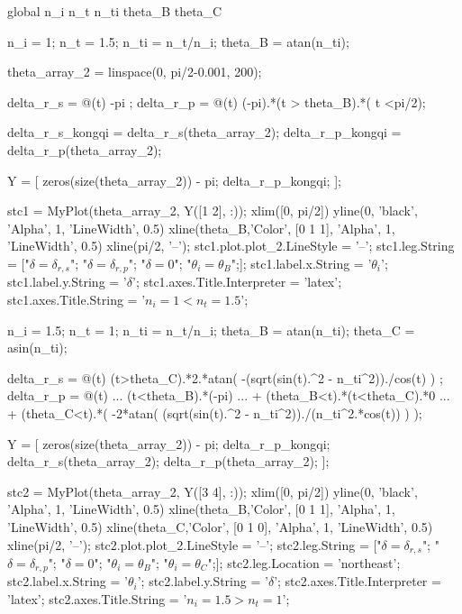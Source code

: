 \documentclass[UTF8]{report}
\theoremstyle{MyLineTheoremStyle} %
\theoremstyle{MyBlockTheoremStyle} %
\theoremstyle{MySubsubsectionStyle} %
\begin{document}
\begin{matlablisting}
global n_i n_t n_ti theta_B theta_C 

n_i = 1;
n_t = 1.5;
n_ti = n_t/n_i;
theta_B = atan(n_ti);

theta_array_2 = linspace(0, pi/2-0.001, 200);

delta_r_s = @(t) -pi ;
delta_r_p = @(t) (-pi).*(t > theta_B).*( t <pi/2);

delta_r_s_kongqi = delta_r_s(theta_array_2);
delta_r_p_kongqi = delta_r_p(theta_array_2);

Y = [
    zeros(size(theta_array_2)) - pi;
    delta_r_p_kongqi;    
];

stc1 = MyPlot(theta_array_2, Y([1 2], :));
xlim([0, pi/2])
yline(0, 'black', 'Alpha', 1, 'LineWidth', 0.5)
xline(theta_B,'Color', [0 1 1], 'Alpha', 1, 'LineWidth', 0.5)
xline(pi/2, '--');
stc1.plot.plot_2.LineStyle = '--';
stc1.leg.String = ["$\delta = \delta_{r,s}$"; "$\delta = \delta_{r,p}$"; "$\delta = 0$"; "$\theta_i = \theta_B$";];
stc1.label.x.String = '$\theta_i$';
stc1.label.y.String = '$\delta$';
stc1.axes.Title.Interpreter = 'latex';
stc1.axes.Title.String = '$n_i = 1 < n_t = 1.5$';

n_i = 1.5;
n_t = 1;
n_ti = n_t/n_i;
theta_B = atan(n_ti);
theta_C = asin(n_ti);


delta_r_s = @(t) (t>theta_C).*2.*atan( -(sqrt(sin(t).^2 - n_ti^2))./cos(t) ) ;
delta_r_p = @(t) ...
     (t<theta_B).*(-pi) ... 
   + (theta_B<t).*(t<theta_C).*0 ... 
   + (theta_C<t).*( -2*atan( (sqrt(sin(t).^2 - n_ti^2))./(n_ti^2.*cos(t)) ) );

Y = [
    zeros(size(theta_array_2)) - pi;
    delta_r_p_kongqi;
    delta_r_s(theta_array_2);
    delta_r_p(theta_array_2);
];


stc2 = MyPlot(theta_array_2, Y([3 4], :));
xlim([0, pi/2])
yline(0, 'black', 'Alpha', 1, 'LineWidth', 0.5)
xline(theta_B,'Color', [0 1 1], 'Alpha', 1, 'LineWidth', 0.5)
xline(theta_C,'Color', [0 1 0], 'Alpha', 1, 'LineWidth', 0.5)
xline(pi/2, '--');
stc2.plot.plot_2.LineStyle = '--';
stc2.leg.String = ["$\delta = \delta_{r,s}$"; "$\delta = \delta_{r,p}$"; "$\delta = 0$"; "$\theta_i = \theta_B$"; "$\theta_i = \theta_C$";];
stc2.leg.Location = 'northeast';
stc2.label.x.String = '$\theta_i$';
stc2.label.y.String = '$\delta$';
stc2.axes.Title.Interpreter = 'latex';
stc2.axes.Title.String = '$n_i = 1.5 > n_t = 1$';
\end{matlablisting}
\end{document}
